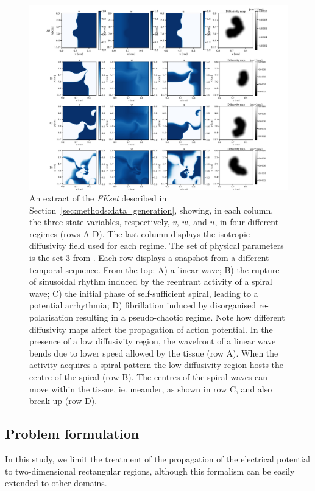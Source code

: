 \documentclass[utf8]{frontiersSCNS} %
\begin{document}
\begin{figure}[tb]
    \centering
    \includegraphics[width=\textwidth]{Figure-1.jpg}    
    \caption{An extract of the \textit{FKset} described in Section~\ref{sec:methods:data_generation}, showing, in each column, the three state variables, respectively, $v$, $w$, and $u$, in four different regimes (rows A-D). The last column displays the isotropic diffusivity field used for each regime.
    The set of physical parameters is the set 3 from \cite{Fenton2002}.
    Each row displays a snapshot from a different temporal sequence.
    From the top: A) a linear wave; B) the rupture of sinusoidal rhythm induced by the reentrant activity of a spiral wave; C) the initial phase of self-sufficient spiral, leading to a potential arrhythmia; D) fibrillation induced by disorganised re-polarisation resulting in a pseudo-chaotic regime.
    Note how different diffusivity maps affect the propagation of action potential. In the presence of a low diffusivity region, the wavefront of a linear wave bends due to lower speed allowed by the tissue (row A). When the activity acquires a spiral pattern the low diffusivity region hosts the centre of the spiral (row B). The centres of the spiral waves can move within the tissue, ie. meander, as shown in row C, and also break up (row D).}
    \label{fig:1}
\end{figure}


\subsection{Problem formulation}
\label{sec:methods:formulation}
In this study, we limit the treatment of the propagation of the electrical potential to two-dimensional rectangular regions, although this formalism can be easily extended to other domains.
 
\end{document}
